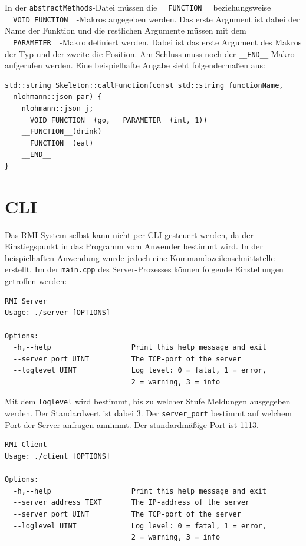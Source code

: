 \documentclass[a4paper,oneside,10pt]{report}
\begin{document}
In der \texttt{abstractMethods}-Datei müssen die \texttt{\_\_FUNCTION\_\_} beziehungsweise \texttt{\_\_VOID\_FUNCTION\_\_}-Makros angegeben werden. Das erste Argument ist dabei der Name der Funktion und die restlichen Argumente müssen mit dem \texttt{\_\_PARAMETER\_\_}-Makro definiert werden. Dabei ist das erste Argument des Makros der Typ und der zweite die Position. Am Schluss muss noch der \texttt{\_\_END\_\_}-Makro aufgerufen werden. Eine beispielhafte Angabe sieht folgendermaßen aus: 

\begin{lstlisting}
std::string Skeleton::callFunction(const std::string functionName, 
  nlohmann::json par) {
    nlohmann::json j;
    __VOID_FUNCTION__(go, __PARAMETER__(int, 1))
    __FUNCTION__(drink)
    __FUNCTION__(eat)
    __END__
}
\end{lstlisting}

\section{CLI}

Das RMI-System selbst kann nicht per CLI gesteuert werden, da der Einstiegspunkt in das Programm vom Anwender bestimmt wird. In der beispielhaften Anwendung wurde jedoch eine Kommandozeilenschnittstelle erstellt. Im der \texttt{main.cpp} des Server-Prozesses können folgende Einstellungen getroffen werden: 
\begin{lstlisting}
RMI Server
Usage: ./server [OPTIONS]

Options:
  -h,--help                   Print this help message and exit
  --server_port UINT          The TCP-port of the server
  --loglevel UINT             Log level: 0 = fatal, 1 = error,
                              2 = warning, 3 = info
\end{lstlisting}

Mit dem \texttt{loglevel} wird bestimmt, bis zu welcher Stufe Meldungen ausgegeben werden. Der Standardwert ist dabei 3. Der \texttt{server\_port} bestimmt auf welchem Port der Server anfragen annimmt. Der standardmäßige Port ist 1113.

\begin{lstlisting}
RMI Client
Usage: ./client [OPTIONS]

Options:
  -h,--help                   Print this help message and exit
  --server_address TEXT       The IP-address of the server
  --server_port UINT          The TCP-port of the server
  --loglevel UINT             Log level: 0 = fatal, 1 = error,
                              2 = warning, 3 = info
\end{lstlisting}
\end{document}

